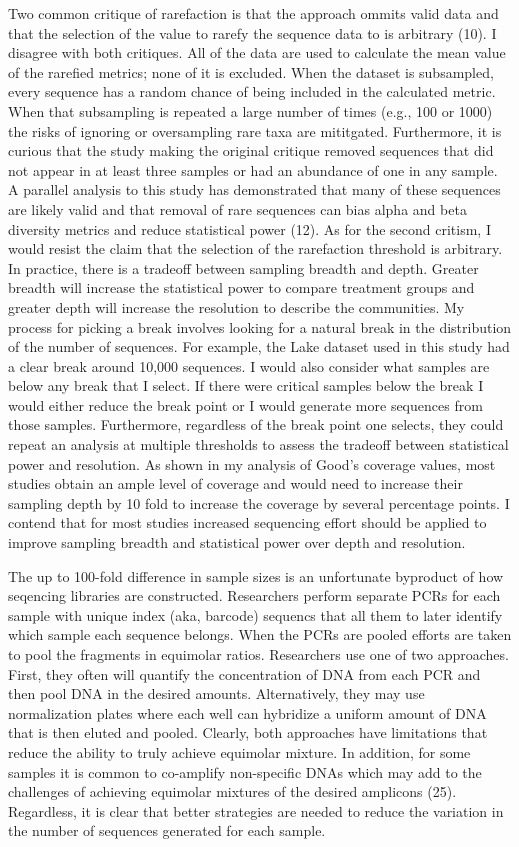 \documentclass[
]{article}
\begin{document}
Two common critique of rarefaction is that the approach ommits valid
data and that the selection of the value to rarefy the sequence data to
is arbitrary (10). I disagree with both critiques. All of the data are
used to calculate the mean value of the rarefied metrics; none of it is
excluded. When the dataset is subsampled, every sequence has a random
chance of being included in the calculated metric. When that subsampling
is repeated a large number of times (e.g., 100 or 1000) the risks of
ignoring or oversampling rare taxa are mititgated. Furthermore, it is
curious that the study making the original critique removed sequences
that did not appear in at least three samples or had an abundance of one
in any sample. A parallel analysis to this study has demonstrated that
many of these sequences are likely valid and that removal of rare
sequences can bias alpha and beta diversity metrics and reduce
statistical power (12). As for the second critism, I would resist the
claim that the selection of the rarefaction threshold is arbitrary. In
practice, there is a tradeoff between sampling breadth and depth.
Greater breadth will increase the statistical power to compare treatment
groups and greater depth will increase the resolution to describe the
communities. My process for picking a break involves looking for a
natural break in the distribution of the number of sequences. For
example, the Lake dataset used in this study had a clear break around
10,000 sequences. I would also consider what samples are below any break
that I select. If there were critical samples below the break I would
either reduce the break point or I would generate more sequences from
those samples. Furthermore, regardless of the break point one selects,
they could repeat an analysis at multiple thresholds to assess the
tradeoff between statistical power and resolution. As shown in my
analysis of Good's coverage values, most studies obtain an ample level
of coverage and would need to increase their sampling depth by 10 fold
to increase the coverage by several percentage points. I contend that
for most studies increased sequencing effort should be applied to
improve sampling breadth and statistical power over depth and
resolution.

The up to 100-fold difference in sample sizes is an unfortunate
byproduct of how seqencing libraries are constructed. Researchers
perform separate PCRs for each sample with unique index (aka, barcode)
sequencs that all them to later identify which sample each sequence
belongs. When the PCRs are pooled efforts are taken to pool the
fragments in equimolar ratios. Researchers use one of two approaches.
First, they often will quantify the concentration of DNA from each PCR
and then pool DNA in the desired amounts. Alternatively, they may use
normalization plates where each well can hybridize a uniform amount of
DNA that is then eluted and pooled. Clearly, both approaches have
limitations that reduce the ability to truly achieve equimolar mixture.
In addition, for some samples it is common to co-amplify non-specific
DNAs which may add to the challenges of achieving equimolar mixtures of
the desired amplicons (25). Regardless, it is clear that better
strategies are needed to reduce the variation in the number of sequences
generated for each sample.
\end{document}
